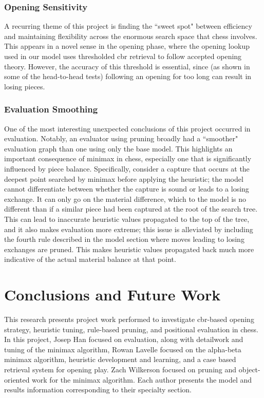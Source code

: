 \documentclass[letterpaper]{article}
\begin{document}
\subsubsection{Opening Sensitivity}
A recurring theme of this project is finding the ``sweet spot" between efficiency and maintaining flexibility across the enormous search space that chess involves.  This appears in a novel sense in the opening phase, where the opening lookup used in our model uses thresholded \acrshort{cbr} retrieval to follow accepted opening theory.  However, the accuracy of this threshold is essential, since (as shown in some of the head-to-head tests) following an opening for too long can result in losing pieces.

\subsubsection{Evaluation Smoothing}
One of the most interesting unexpected conclusions of this project occurred in evaluation.  Notably, an evaluator using pruning broadly had a ``smoother" evaluation graph than one using only the base model.  This highlights an important consequence of minimax in chess, especially one that is significantly influenced by piece balance.  Specifically, consider a capture that occurs at the deepest point searched by minimax before applying the heuristic; the model cannot differentiate between whether the capture is sound or leads to a losing exchange.  It can only go on the material difference, which to the model is no different than if a similar piece had been captured at the root of the search tree.  This can lead to inaccurate heuristic values propagated to the top of the tree, and it also makes evaluation more extreme; this issue is alleviated by including the fourth rule described in the model section where moves leading to losing exchanges are pruned.  This makes heuristic values propagated back much more indicative of the actual material balance at that point.

\section{Conclusions and Future Work}
This research presents project work performed to investigate \acrshort{cbr}-based opening strategy, heuristic tuning, rule-based pruning, and positional evaluation in chess.  In this project, Josep Han focused on evaluation, along with detailwork and tuning of the minimax algorithm, Rowan Lavelle focused on the alpha-beta minimax algorithm, heuristic development and learning, and a case based retrieval system for opening play. Zach Wilkerson focused on pruning and object-oriented work for the minimax algorithm.  Each author presents the model and results information corresponding to their specialty section.



\end{document}
